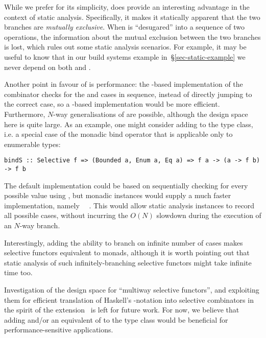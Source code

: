 \noindent
While we prefer  for its simplicity,  does provide an
interesting advantage in the context of static analysis. Specifically, it makes
it statically apparent that the two branches are \emph{mutually exclusive}. When
 is ``desugared'' into a sequence of two  operations, the
information about the mutual exclusion between the two branches is lost, which
rules out some static analysis scenarios. For example, it may be useful to know
that in our build systems example in~\S\ref{sec-static-example} we never depend
on both  and .

Another point in favour of  is performance: the -based
implementation of the  combinator checks for the  and
 cases in sequence, instead of directly jumping to the correct case,
so a -based implementation would be more efficient. Furthermore,
$N$-way generalisations of  are possible, although the design space
here is quite large. As an example, one might consider adding  to the
 type class, i.e. a special case of the monadic bind operator that
is applicable only to enumerable types:

\vspace{1mm}
\begin{verbatim}
bindS :: Selective f => (Bounded a, Enum a, Eq a) => f a -> (a -> f b) -> f b
\end{verbatim}
\vspace{1mm}

\noindent
The default implementation could be based on sequentially checking for every
possible value using , but monadic instances would supply a much
faster implementation, namely ~\hs{=}~\hs{(>>=)}. This would allow
static analysis instances to record all possible cases, without incurring
the $O(N)$ slowdown during the execution of an $N$-way branch.

Interestingly, adding the ability to branch on infinite number of cases makes
selective functors equivalent to monads, although it is worth pointing out that
static analysis of such infinitely-branching selective functors might take
infinite time too.

Investigation of the design space for ``multiway selective functors'', and
exploiting them for efficient translation of Haskell's -notation into
selective combinators in the spirit of the 
extension~\citep{marlow2016applicativedo} is left for future work. For now, we
believe that adding  and/or an equivalent of  to the
 type class would be beneficial for performance-sensitive
applications.

